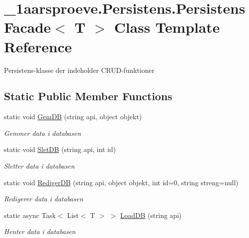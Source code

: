 \hypertarget{class__1aarsproeve_1_1_persistens_1_1_persistens_facade}{}\section{\+\_\+1aarsproeve.\+Persistens.\+Persistens\+Facade$<$ T $>$ Class Template Reference}
\label{class__1aarsproeve_1_1_persistens_1_1_persistens_facade}


Persistens-\/klasse der indeholder C\+R\+U\+D-\/funktioner  


\subsection*{Static Public Member Functions}
\begin{DoxyCompactItemize}
\item 
static void \hyperlink{class__1aarsproeve_1_1_persistens_1_1_persistens_facade_a58be4f9dca4d750397b687f82a75b242}{Gem\+D\+B} (string api, object objekt)
\begin{DoxyCompactList}\small\item\em Gemmer data i databasen \end{DoxyCompactList}\item 
static void \hyperlink{class__1aarsproeve_1_1_persistens_1_1_persistens_facade_a1145232ebea2ac7839d0260599c8bd42}{Slet\+D\+B} (string api, int id)
\begin{DoxyCompactList}\small\item\em Sletter data i databasen \end{DoxyCompactList}\item 
static void \hyperlink{class__1aarsproeve_1_1_persistens_1_1_persistens_facade_aaacc8d60cd5adf86552af54cf7230932}{Rediger\+D\+B} (string api, object objekt, int id=0, string streng=null)
\begin{DoxyCompactList}\small\item\em Redigerer data i databasen \end{DoxyCompactList}\item 
static async Task$<$ List$<$ T $>$ $>$ \hyperlink{class__1aarsproeve_1_1_persistens_1_1_persistens_facade_a282e4349d842d409431aebceaa12f978}{Load\+D\+B} (string api)
\begin{DoxyCompactList}\small\item\em Henter data i databasen \end{DoxyCompactList}\end{DoxyCompactItemize}


